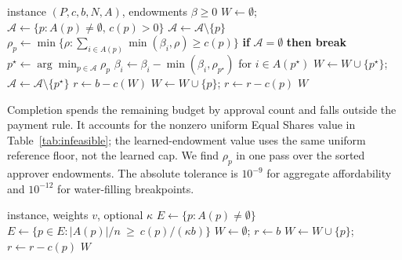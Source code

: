 \begin{algorithm}[ht]
\caption{Equal Shares with general endowments, and completion}
\label{alg:mes}
\begin{algorithmic}[1]
\Require instance $(P, c, b, N, A)$, endowments $\beta \ge 0$
\State $W \gets \emptyset$;\; $\mathcal{A} \gets \{p : A(p) \neq \emptyset,\, c(p) > 0\}$
     \State $\mathcal{A} \gets \mathcal{A} \setminus \{p\}$ 
    \Else \State $\rho_p \gets \min\{\rho : \sum_{i \in A(p)} \min(\beta_i, \rho) \ge c(p)\}$
    \EndIf
  \EndFor
  \State \textbf{if} $\mathcal{A} = \emptyset$ \textbf{then break}
  \State $p^\star \gets \arg\min_{p \in \mathcal{A}} \rho_p$ 
  \State $\beta_i \gets \beta_i - \min(\beta_i, \rho_{p^\star})$ for $i \in A(p^\star)$
  \State $W \gets W \cup \{p^\star\}$;\; $\mathcal{A} \gets \mathcal{A} \setminus \{p^\star\}$
\EndWhile
\State {}
\State $r \gets b - c(W)$
   \State $W \gets W \cup \{p\}$;\; $r \gets r - c(p)$ \EndIf
\EndFor
\State \Return $W$
\end{algorithmic}
\end{algorithm}

Completion spends the remaining budget by approval count and falls outside the
payment rule. It accounts for the nonzero uniform Equal Shares value in
Table~\ref{tab:infeasible}; the learned-endowment value uses the same uniform
reference floor, not the learned cap. We find $\rho_p$ in one pass over the
sorted approver endowments. The absolute tolerance is $10^{-9}$ for aggregate
affordability and $10^{-12}$ for water-filling breakpoints.

\begin{algorithm}[ht]
\caption{Outcome family, with an optional support floor}
\label{alg:outcome}
\begin{algorithmic}[1]
\Require instance, weights $v$, optional $\kappa$
\State $E \gets \{p : A(p) \neq \emptyset\}$
 \State $E \gets \{p \in E : |A(p)|/n \ \ge\ c(p)/(\kappa b)\}$ \EndIf
\State $W \gets \emptyset$;\; $r \gets b$
   \State $W \gets W \cup \{p\}$;\; $r \gets r - c(p)$ \EndIf
\EndFor
\State \Return $W$
\end{algorithmic}
\end{algorithm}

